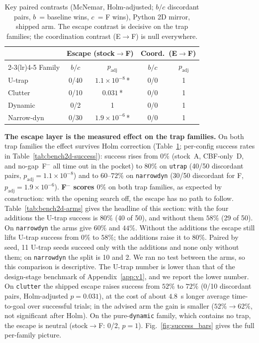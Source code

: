 \documentclass[journal]{IEEEtran}
\begin{document}
\begin{table}[t]
\centering
\caption{Key paired contrasts (McNemar, Holm-adjusted; $b/c$ discordant
pairs, $b$~= baseline wins, $c$~= F wins), Python 2D mirror, shipped arm.
The escape contrast is decisive on the trap families; the coordination contrast
(E$\to$F) is null everywhere.}
\label{tab:bench2d-stats}
\footnotesize
\setlength{\tabcolsep}{4pt}
\begin{tabular}{lcccc}
\toprule
 & \multicolumn{2}{c}{Escape (stock$\to$F)} & \multicolumn{2}{c}{Coord.\ (E$\to$F)} \\
\cmidrule(lr){2-3}\cmidrule(lr){4-5}
Family & $b/c$ & $p_\text{adj}$ & $b/c$ & $p_\text{adj}$ \\
\midrule
U-trap     & 0/40 & $1.1\!\times\!10^{-8}$\,* & 0/0 & 1 \\
Clutter    & 0/10 & $0.031$\,*                 & 0/0 & 1 \\
Dynamic    & 0/2  & 1                          & 0/0 & 1 \\
Narrow-dyn & 0/30 & $1.9\!\times\!10^{-6}$\,* & 0/0 & 1 \\
\bottomrule
\end{tabular}
\end{table}

\textbf{The escape layer is the measured effect on the trap families.} On both trap
families the effect survives Holm correction (Table~\ref{tab:bench2d-stats}; per-config success
rates in Table~\ref{tab:bench2d-success}): success rises
from $0\%$ (stock~A, CBF-only~D, and no-gap~F$^{-}$ all time out in the pocket) to $80\%$
on \texttt{utrap} (40/50 discordant pairs, $p_\text{adj}=1.1\times10^{-8}$) and to $60$--$72\%$ on
\texttt{narrowdyn} (30/50 discordant for F, $p_\text{adj}=1.9\times10^{-6}$). \textbf{F$^{-}$ scores $0\%$} on both trap families, as expected by construction: with the
opening search off, the escape has no path to follow.
Table~\ref{tab:bench2d-arms} gives the headline of this section: with the four additions
the U-trap success is $80\%$ (40 of 50), and without them $58\%$ (29 of 50). On
\texttt{narrowdyn} the arms give $60\%$ and $44\%$. Without the additions the escape
still lifts U-trap success from $0\%$ to $58\%$; the additions raise it to $80\%$. Paired by
seed, 11 U-trap seeds succeed only with the additions and none only without them; on
\texttt{narrowdyn} the split is 10 and 2. We ran no test between the arms, so this
comparison is descriptive. The U-trap number is lower than that of the design-stage benchmark of
Appendix~\ref{app:v1}, and we report the lower number. On \texttt{clutter} the shipped escape raises success
from $52\%$ to $72\%$ (0/10 discordant pairs, Holm-adjusted $p=0.031$), at the cost of
about $4.8$~s longer average time-to-goal over successful trials; in the advised arm the
gain is smaller ($52\%\to62\%$, not significant after Holm). On the pure-\texttt{dynamic}
family, which contains no trap, the escape is neutral (stock$\to$F: 0/2, $p=1$).
Fig.~\ref{fig:success_bars} gives the full per-family picture.
\end{document}
